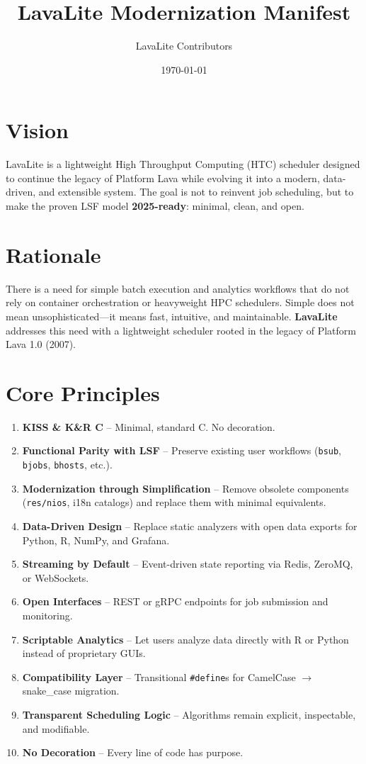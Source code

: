 \documentclass[11pt,a4paper]{article}
\title{\textbf{LavaLite Modernization Manifest}}
\author{LavaLite Contributors}
\date{\today}
\begin{document}
\maketitle

\section{Vision}
LavaLite is a lightweight High Throughput Computing (HTC) scheduler designed
to continue the legacy of Platform Lava while evolving it into a modern,
data-driven, and extensible system.
The goal is not to reinvent job scheduling, but to make the proven LSF model
\textbf{2025-ready}: minimal, clean, and open.

\section{Rationale}
There is a need for simple batch execution and analytics workflows that do not
rely on container orchestration or heavyweight HPC schedulers.  Simple does not
mean unsophisticated—it means fast, intuitive, and maintainable. \textbf{LavaLite}
addresses this need with a lightweight scheduler rooted in the legacy of
Platform Lava 1.0 (2007).

\section{Core Principles}
\begin{enumerate}
  \item \textbf{KISS \& K\&R C} – Minimal, standard C. No decoration.
  \item \textbf{Functional Parity with LSF} – Preserve existing user workflows
        (\texttt{bsub}, \texttt{bjobs}, \texttt{bhosts}, etc.).
  \item \textbf{Modernization through Simplification} – Remove obsolete
        components (\texttt{res/nios}, i18n catalogs) and replace them with
        minimal equivalents.
  \item \textbf{Data-Driven Design} – Replace static analyzers with open
        data exports for Python, R, NumPy, and Grafana.
  \item \textbf{Streaming by Default} – Event-driven state reporting via
        Redis, ZeroMQ, or WebSockets.
  \item \textbf{Open Interfaces} – REST or gRPC endpoints for job
        submission and monitoring.
  \item \textbf{Scriptable Analytics} – Let users analyze data directly
        with R or Python instead of proprietary GUIs.
  \item \textbf{Compatibility Layer} – Transitional \texttt{\#define}s for
        CamelCase $\rightarrow$ snake\_case migration.
  \item \textbf{Transparent Scheduling Logic} – Algorithms remain explicit,
        inspectable, and modifiable.
  \item \textbf{No Decoration} – Every line of code has purpose.
\end{enumerate}
\end{document}
